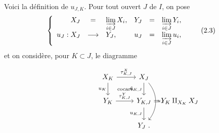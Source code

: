Voici la définition de $u_{J,K}$. Pour tout ouvert $J$ de $I$, on pose
\[
\left\{
\begin{array}{rclrcl}
X_J & = & \varinjlim\limits_{i\in J} X_i, & Y_J & = & \varinjlim\limits_{i\in J} Y_i,\\[2ex]
u_J : X_J & \longrightarrow & Y_J, & u_J & = & \varinjlim\limits_{i\in J} u_i,
\end{array}
\right.
\tag*{(2.3)}
\]
et on considère, pour $K \subset J$, le diagramme



\[
\begin{tikzcd}
X_K \arrow[r, "\tau^X_{K,J}"] \arrow[d, "u_K"'] \arrow[dr, phantom, "\text{\scriptsize cocart.}"] & X_J \arrow[d, "\tilde{u}_{K,J}"'] \arrow[dd, bend left=40, "u_J"] \\
Y_K \arrow[r, "\tau^Y_{K,J}"] & Y_{K,J} \rlap{$\ = Y_K \amalg_{X_K} X_J$} \arrow[d, "u_{K,J}"'] \\
 & Y_J \ .
\end{tikzcd}
\]

